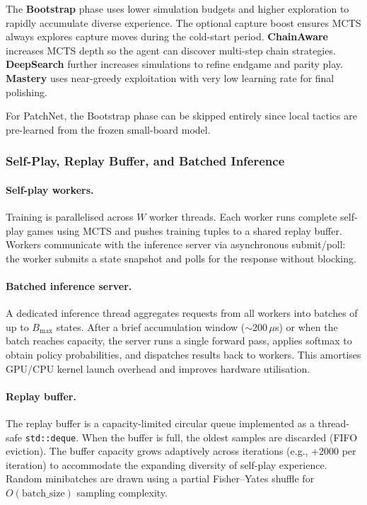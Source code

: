 \documentclass[11pt]{article}
\begin{document}
The \textbf{Bootstrap} phase uses lower simulation budgets and higher exploration
to rapidly accumulate diverse experience. The optional capture boost ensures
MCTS always explores capture moves during the cold-start period.
\textbf{ChainAware} increases MCTS depth so the agent can discover
multi-step chain strategies. \textbf{DeepSearch} further increases
simulations to refine endgame and parity play. \textbf{Mastery} uses
near-greedy exploitation with very low learning rate for final polishing.

For PatchNet, the Bootstrap phase can be skipped entirely since local
tactics are pre-learned from the frozen small-board model.

\subsubsection{Self-Play, Replay Buffer, and Batched Inference}
\label{sec:replay}

\paragraph{Self-play workers.}
Training is parallelised across $W$ worker threads. Each worker runs
complete self-play games using MCTS and pushes training tuples to a
shared replay buffer. Workers communicate with the inference server via
asynchronous submit/poll: the worker submits a state snapshot and polls
for the response without blocking.

\paragraph{Batched inference server.}
A dedicated inference thread aggregates requests from all workers into
batches of up to $B_{\max}$ states. After a brief accumulation window
($\sim$200\,$\mu$s) or when the batch reaches capacity, the server
runs a single forward pass, applies softmax to obtain policy probabilities,
and dispatches results back to workers. This amortises GPU/CPU kernel
launch overhead and improves hardware utilisation.

\paragraph{Replay buffer.}
The replay buffer is a capacity-limited circular queue implemented as a
thread-safe \texttt{std::deque}. When the buffer is full, the oldest
samples are discarded (FIFO eviction). The buffer capacity grows
adaptively across iterations (e.g., +2000 per iteration) to accommodate
the expanding diversity of self-play experience. Random minibatches are
drawn using a partial Fisher--Yates shuffle for
$O(\text{batch\_size})$ sampling complexity.
\end{document}
